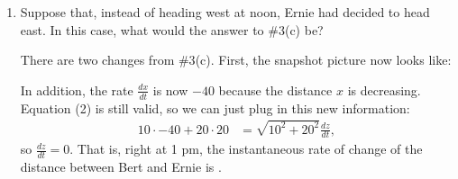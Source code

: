 \documentclass{article}
\begin{document}
\begin{enumerate}
\begin{enumerate}
\begin{solution}
\begin{center}
      \end{center}
      The generic situation is the same, so equation
      (2) is still valid.  Plugging our
      new snapshot information into it gives
      \begin{align*}
        90 \cdot 40 + 20 \cdot 20 &= \sqrt{90^2 + 20^2} \frac{dz}{dt},
      \end{align*}
      so $\frac{dz}{dt} = \frac{4000}{\sqrt{8500}} =
      \frac{400}{\sqrt{85}}$.  So, at 1 pm, the distance between Bert and
      Ernie is .
    \end{solution}

  \item
    \begin{problem}[\nstretch{1.2}]
      Suppose that, instead of heading west at noon, Ernie had decided to
      head east.  In this case, what would the answer to
      {{{{\#3}}(c)}} be?
    \end{problem}

    \begin{solution} %
      There are two changes from {{{{\#3}}(c)}}.  First,
      the snapshot picture now looks like:
      \begin{center}

      \end{center}
      In addition, the rate $\frac{dx}{dt}$ is now $-40$ because the
      distance $x$ is decreasing.  Equation
      (2) is still valid, so we can just
      plug in this new information:
      \begin{align*}
        10 \cdot -40 + 20 \cdot 20 &= \sqrt{10^2 + 20^2} \frac{dz}{dt},
      \end{align*}      
      so $\frac{dz}{dt} = 0$.  That is, right at 1 pm, the instantaneous
      rate of change of the distance between Bert and Ernie is .
    \end{solution}


\end{enumerate}
\end{enumerate}
\end{document}
